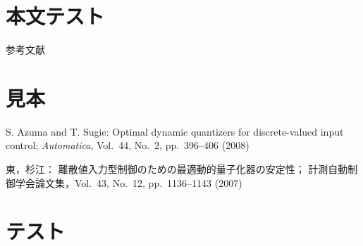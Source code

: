 \documentclass[twocolumn]{jsarticle}
\begin{document}
    \section*{本文テスト}
        参考文献\cite{azuma2008optimal,東俊一2007離散値入力型制御のための最適動的量子化器の安定性}

    \section*{見本}
        \begin{thebibliography}{9}
            S. Azuma and T. Sugie:
            Optimal dynamic quantizers for discrete-valued input control;
            {\it Automatica}, Vol.~44, No.~2, pp.~396--406 (2008)

            東，杉江：
            離散値入力型制御のための最適動的量子化器の安定性；
            計測自動制御学会論文集，Vol.~43, No.~12, pp.~1136--1143 (2007)





        \end{thebibliography}

    \section*{テスト}
        
        
\end{document}
